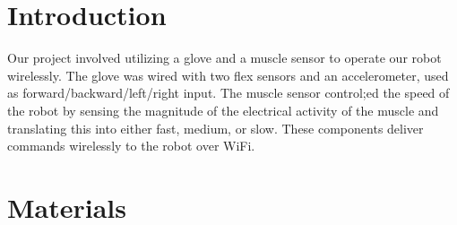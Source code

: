 \documentclass[12pt,scrartcl,titlepage]{article}
\begin{document}
\cfoot{\thepage}



\tableofcontents

\pagebreak


\section{Introduction}

Our project involved utilizing a glove and a muscle sensor to operate our robot wirelessly. The glove was wired with two flex sensors and an accelerometer, used as forward/backward/left/right input.  The muscle sensor control;ed the speed of the robot by sensing the magnitude of the electrical activity of the muscle and translating this into either fast, medium, or slow.  These components deliver commands wirelessly to the robot over WiFi.

\section{Materials}
\end{document}
